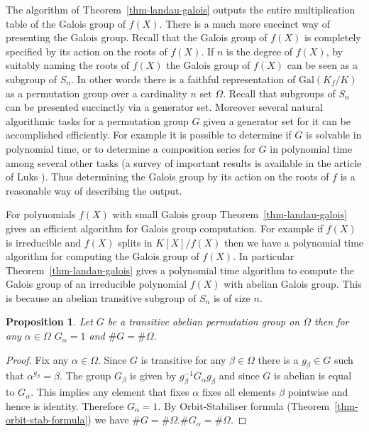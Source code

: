 \documentclass[11pt]{madras}%
\newtheorem{proposition}[theorem]{Proposition}
\theoremstyle{remark}
\newcommand{\Gal}[1]{{\ensuremath{\mathrm{Gal}\left(#1\right)}}}
\begin{document}
The algorithm of Theorem~\ref{thm-landau-galois} outputs the entire
multiplication table of the Galois group of $f(X)$. There is a much
more succinct way of presenting the Galois group. Recall that the
Galois group of $f(X)$ is completely specified by its action on the
roots of $f(X)$. If $n$ is the degree of $f(X)$, by suitably naming
the roots of $f(X)$ the Galois group of $f(X)$ can be seen as a
subgroup of $S_n$. In other words there is a faithful representation
of $\Gal{K_f/K}$ as a permutation group over a cardinality $n$ set
$\Omega$. Recall that subgroups of $S_n$ can be presented succinctly
via a generator set. Moreover several natural algorithmic tasks for a
permutation group $G$ given a generator set for it can be accomplished
efficiently. For example it is possible to determine if $G$ is
solvable in polynomial time, or to determine a composition series for
$G$ in polynomial time among several other tasks (a survey of
important results is available in the article of Luks
\cite{luks93permutation}).  Thus determining the Galois group by its
action on the roots of $f$ is a reasonable way of describing the
output.

For polynomials $f(X)$ with small Galois group
Theorem~\ref{thm-landau-galois} gives an efficient algorithm for
Galois group computation. For example if $f(X)$ is irreducible and
$f(X)$ splits in $K[X]/f(X)$ then we have a polynomial time algorithm
for computing the Galois group of $f(X)$. In particular
Theorem~\ref{thm-landau-galois} gives a polynomial time algorithm to
compute the Galois group of an irreducible polynomial $f(X)$ with
abelian Galois group.  This is because an abelian transitive subgroup
of $S_n$ is of size $n$.

\begin{proposition}\label{prop-abelian-transitive}
  Let $G$ be a transitive abelian permutation group on $\Omega$ then
  for any $\alpha \in \Omega$ $G_\alpha = 1$ and $\# G = \#
  \Omega$.
\end{proposition}
\begin{proof}
  Fix any $\alpha \in \Omega$. Since $G$ is transitive for any $\beta
  \in \Omega$ there is a $g_\beta \in G$ such that $\alpha^{g_\beta} =
  \beta$. The group $G_\beta$ is given by $g_\beta^{-1}G_\alpha
  g_\beta$ and since $G$ is abelian is equal to $G_\alpha$. This
  implies any element that fixes $\alpha$ fixes all elements $\beta$
  pointwise and hence is identity. Therefore $G_\alpha =1$.  By
  Orbit-Stabiliser formula (Theorem~\ref{thm-orbit-stab-formula}) we
  have $\# G = \# \Omega . \# G_\alpha = \# \Omega$.
\end{proof}
\end{document}
